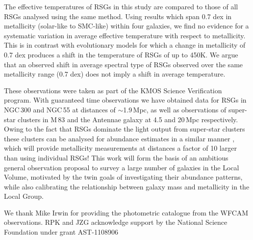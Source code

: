 \documentclass[iop]{emulateapj}
\begin{document}
The effective temperatures of RSGs in this study are compared to those of all RSGs analysed using the same method.
Using results which span 0.7 dex in metallicity (solar-like to SMC-like) within four galaxies, we find no evidence for a systematic variation in average effective temperature with respect to metallicity.
This is in contrast with evolutionary models for which a change in metallicity of 0.7 dex produces a shift in the temperature of RSGs of up to 450K.
We argue that an observed shift in average spectral type of RSGs observed over the same metallicity range (0.7 dex) does not imply a shift in average temperature.

These observations were taken as part of the KMOS Science Verification program.
With guaranteed time observations we have obtained data for RSGs in NGC\,300 and NGC\,55 at distances of $\sim$1.9\,Mpc,
as well as observations of super-star clusters in M\,83 and the Antennae galaxy at 4.5 and 20\,Mpc respectively.
Owing to the fact that RSGs dominate the light output from super-star clusters
\citep{2013MNRAS.430L..35G} these clusters can be analysed for abundance estimates in a similar manner
\citep{2014ApJ...787..142G},
which will provide metallicity measurements at distances a factor of 10 larger than using individual RSGs!
This work will form the basis of an ambitious general observation proposal to survey a large number of galaxies in the Local Volume,
motivated by the twin goals of investigating their abundance patterns,
while also calibrating the relationship between galaxy mass and metallicity in the Local Group.





\acknowledgments

We thank Mike Irwin for providing the photometric catalogue from the WFCAM observations.
RPK and JZG acknowledge support by the National Science Foundation under grant AST-1108906
\end{document}
